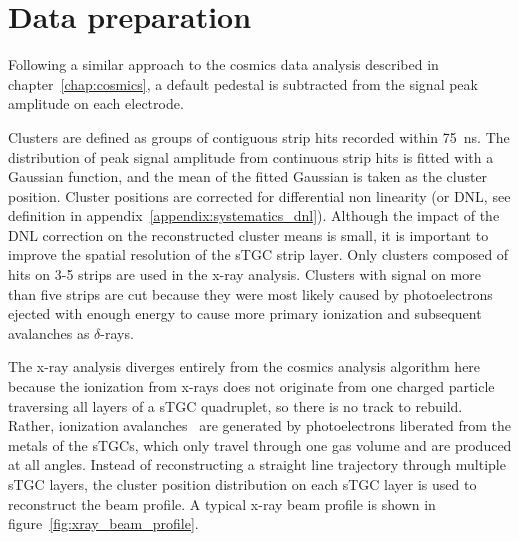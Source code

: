 \section{Data preparation}

Following a similar approach to the cosmics data analysis described in chapter~\ref{chap:cosmics}, a default pedestal is subtracted from the signal peak amplitude on each electrode.

Clusters are defined as groups of contiguous strip hits recorded within \SI{75}{ns}. The distribution of peak signal amplitude from continuous strip hits is fitted with a Gaussian function, and the mean of the fitted Gaussian is taken as the cluster position. Cluster positions are corrected for differential non linearity (or DNL, see definition in appendix~\ref{appendix:systematics_dnl}). Although the impact of the DNL correction on the reconstructed cluster means is small, it is important to improve the spatial resolution of the sTGC strip layer. Only clusters composed of hits on 3-5 strips are used in the x-ray analysis. Clusters with signal on more than five strips are cut because they were most likely caused by photoelectrons ejected with enough energy to cause more primary ionization and subsequent avalanches as $\delta$-rays.

The x-ray analysis diverges entirely from the cosmics analysis algorithm here because the ionization from x-rays does not originate from one charged particle traversing all layers of a sTGC quadruplet, so there is no track to rebuild. Rather, ionization avalanches~\cite{townsend_electricity_1915} are generated by photoelectrons liberated from the metals of the sTGCs, which only travel through one gas volume and are produced at all angles. Instead of reconstructing a straight line trajectory through multiple sTGC layers, the cluster position distribution on each sTGC layer is used to reconstruct the beam profile. A typical x-ray beam profile is shown in figure~\ref{fig:xray_beam_profile}.

